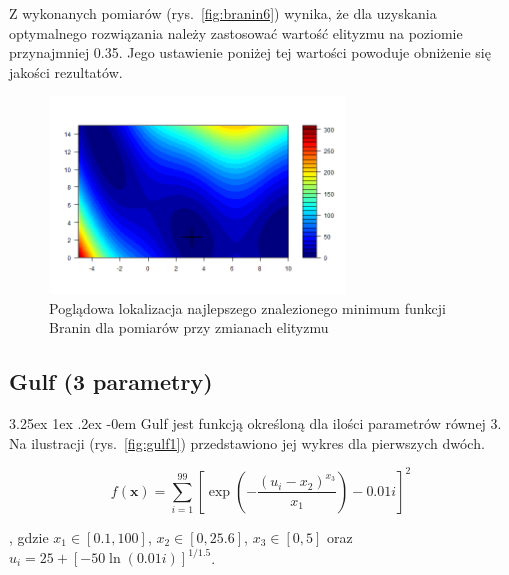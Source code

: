\documentclass[11pt, a4paper]{article}
\makeatletter
\newcommand{\fbi}{\leavevmode{\parindent=1em\indent}}
\renewcommand\paragraph{\@startsection{paragraph}{5}{\z@}
  {3.25ex \@plus1ex \@minus.2ex}
  {-0em}
  {\normalfont\normalsize\bfseries}}
\makeatother
\begin{document}
\fbi
Z wykonanych pomiarów (rys.~\ref{fig:branin6}) wynika, że dla uzyskania optymalnego rozwiązania należy zastosować wartość elityzmu na poziomie przynajmniej 0.35. Jego ustawienie poniżej tej wartości powoduje obniżenie się jakości rezultatów.

\begin{figure}[H]
	\centering
	\includegraphics[width=0.7\textwidth]{./assets/Branin6elt.png}
	\caption{Poglądowa lokalizacja najlepszego znalezionego minimum funkcji Branin dla pomiarów przy zmianach elityzmu}
	\label{fig:branin6elt}
\end{figure}

\newpage
\subsection{Gulf (3 parametry)}
\paragraph{}
Gulf jest funkcją określoną dla ilości parametrów równej 3. Na ilustracji (rys.~\ref{fig:gulf1}) przedstawiono jej wykres dla pierwszych dwóch.

\begin{equation}\label{eq:gulf}
f(\boldsymbol{x}) = \sum_{i=1}^{99} [\exp(- \frac{(u_i - x_2)^{x_3}}{x_1}) - 0.01i]^2
\end{equation}

, gdzie $ x_1 \in [0.1, 100] $, $ x_2 \in [0, 25.6] $, $ x_3 \in [0, 5] $ oraz $ u_i = 25 + [-50 \ln (0.01i)]^{1/1.5} $.
\end{document}

